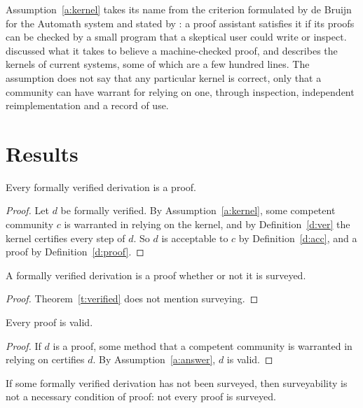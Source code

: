 \documentclass{situationist-preprint}
\begin{document}
Assumption~\ref{a:kernel} takes its name from the criterion formulated by de Bruijn for the Automath system and stated by \citet{BarendregtWiedijk2005}: a proof assistant satisfies it if its proofs can be checked by a small program that a skeptical user could write or inspect. \citet{Pollack1998} discussed what it takes to believe a machine-checked proof, and \citet{Harrison2008} describes the kernels of current systems, some of which are a few hundred lines. The assumption does not say that any particular kernel is correct, only that a community can have warrant for relying on one, through inspection, independent reimplementation and a record of use.

\section{Results}

\begin{theorem}\label{t:verified}
Every formally verified derivation is a proof.
\end{theorem}

\begin{proof}
Let $d$ be formally verified. By Assumption~\ref{a:kernel}, some competent community $c$ is warranted in relying on the kernel, and by Definition~\ref{d:ver} the kernel certifies every step of $d$. So $d$ is acceptable to $c$ by Definition~\ref{d:acc}, and a proof by Definition~\ref{d:proof}.
\end{proof}

\begin{corollary}\label{c:survey}
A formally verified derivation is a proof whether or not it is surveyed.
\end{corollary}

\begin{proof}
Theorem~\ref{t:verified} does not mention surveying.
\end{proof}

\begin{proposition}\label{p:valid}
Every proof is valid.
\end{proposition}

\begin{proof}
If $d$ is a proof, some method that a competent community is warranted in relying on certifies $d$. By Assumption~\ref{a:answer}, $d$ is valid.
\end{proof}

\begin{proposition}\label{p:notnec}
If some formally verified derivation has not been surveyed, then surveyability is not a necessary condition of proof: not every proof is surveyed.
\end{proposition}
\end{document}
